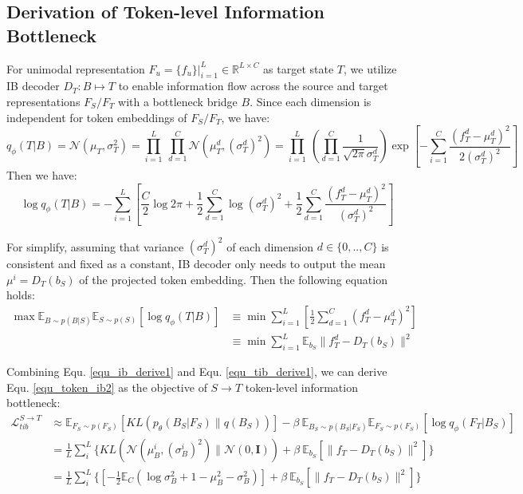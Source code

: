 \documentclass{article}
\begin{document}
\subsection{Derivation of Token-level Information Bottleneck} For unimodal representation $F_u=\{f_u\}|_{i=1}^L\in\mathbb{R}^{L\times C}$ as target state $T$, we utilize IB decoder $D_T:B\mapsto T$ to enable information flow across the source and target representations $F_S/F_T$ with a bottleneck bridge $B$. Since each dimension is independent for token embeddings of $F_S/F_T$, we have:
\begin{equation}
    q_\phi(T|B) = \mathcal{N}(\mu_T, \sigma^2_T) =\prod_{i=1}^{L}\ \prod_{d=1}^{C} \mathcal{N}(\mu^{d}_T, (\sigma_T^{d})^2) =\prod_{i=1}^{L}\ \left(\prod_{d=1}^{C}\frac{1}{\sqrt{2\pi}\sigma^d_T}\right)\exp{\left[-\sum_{i=1}^{C}\frac{(f^d_T-\mu^d_T)^2}{2(\sigma_T^{d})^2} \right]}
\end{equation}
Then we have:
\begin{equation}
    \log q_\phi(T|B) = -\sum^L_{i=1}\left[\frac{C}{2} \log{2\pi} + \frac{1}{2} \sum^C_{d=1} \log (\sigma_T^{d})^2 + \frac{1}{2} \sum^C_{d=1}  \frac{(f^d_T-\mu^d_T)^2}{(\sigma_T^{d})^2}\right]
\end{equation}

For simplify, assuming that variance $(\sigma_T^{d})^2$ of each dimension $d\in\{0,..,C\}$ is consistent and fixed as a constant, IB decoder only needs to output the mean $\mu^i=D_T(b_S)$ of the projected token embedding. Then the following equation holds:
\begin{equation}
\begin{aligned}
    \max \mathbb{E}_{B\sim p(B|S)}\mathbb{E}_{S\sim p(S)} [\log q_\phi(T|B)] &\equiv \min \sum^L_{i=1}\left[\frac{1}{2} \sum^C_{d=1} (f^d_T-\mu^d_T)^2\right] \\
    &\equiv \min \sum^L_{i=1}\mathbb{E}_{b_S} \parallel f^d_T-D_T(b_S)\parallel^2
\end{aligned}
\label{equ_tib_derive1}
\end{equation}

Combining Equ. \ref{equ_ib_derive1} and Equ. \ref{equ_tib_derive1}, we can derive Equ. \ref{equ_token_ib2} as the objective of $S\rightarrow T$ token-level information bottleneck:
\begin{equation}
\begin{aligned}
    \mathcal{L}^{S\rightarrow T}_{tib} &\approx \mathbb{E}_{F_S\sim p(F_S)} \left[KL( p_\theta(B_S|F_S)\parallel q(B_S))\right] - \beta\ \mathbb{E}_{B_S\sim p(B_S|F_S)}\mathbb{E}_{F_S\sim p(F_S)} [\log q_\phi(F_T|B_S)]\\
    &=\frac{1}{L}\sum^L_{i} \{KL( \mathcal{N}(\mu^i_B, (\sigma_B^{i})^2)\parallel\mathcal{N}(0,\textbf{I})) + \beta\ \mathbb{E}_{b_S} [\parallel f_T-D_T(b_S)\parallel^2] \} \\
    &= \frac{1}{L}\sum^L_{i} \{\left[-\frac{1}{2} \mathbb{E}_C  \left(\log \sigma^2_B + 1 - \mu^2_B-\sigma^2_B\right) \right]+ \beta\ \mathbb{E}_{b_S} [\parallel f_T-D_T(b_S)\parallel^2]\}
\end{aligned}
\end{equation}
\end{document}
